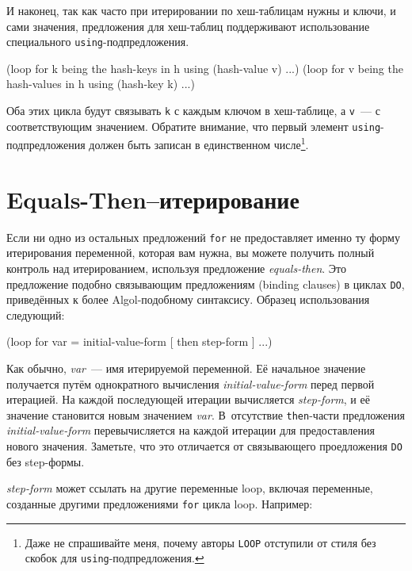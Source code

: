 И наконец, так как часто при итерировании по хеш-таблицам нужны и ключи, и сами значения,
предложения для хеш-таблиц поддерживают использование специального
\lstinline{using}-подпредложения.

\begin{myverb}
(loop for k being the hash-keys in h using (hash-value v) ...)
(loop for v being the hash-values in h using (hash-key k) ...)
\end{myverb}

Оба этих цикла будут связывать \lstinline{k} с каждым ключом в хеш-таблице, а \lstinline{v}~--- с
соответствующим значением. Обратите внимание, что первый элемент
\lstinline{using}-подпредложения должен быть записан в единственном числе\footnote{Даже не
    спрашивайте меня, почему авторы \lstinline{LOOP} отступили от стиля без скобок для
    \lstinline{using}-подпредложения.}\hspace{\footnotenegspace}.

\section{Equals-Then--итерирование}

Если ни одно из остальных предложений \lstinline{for} не предоставляет именно ту форму
итерирования переменной, которая вам нужна, вы можете получить полный контроль над
итерированием, используя предложение \textit{equals-then}. Это предложение подобно
связывающим предложениям (binding clauses) в циклах \lstinline{DO}, приведённых к более
Algol-подобному синтаксису. Образец использования следующий:

\begin{myverb}
(loop for var = initial-value-form [ then step-form ] ...)
\end{myverb}

Как обычно, \textit{var}~--- имя итерируемой переменной. Её начальное значение получается
путём однократного вычисления \textit{initial-value-form} перед первой итерацией. На
каждой последующей итерации вычисляется \textit{step-form}, и её значение становится новым
значением \textit{var}. В~отсутствие \lstinline{then}-части предложения
\textit{initial-value-form} перевычисляется на каждой итерации для предоставления нового
значения. Заметьте, что это отличается от связывающего проедложения \lstinline{DO} без
step-формы.

\textit{step-form} может ссылать на другие переменные loop, включая переменные, созданные
другими предложениями \lstinline{for} цикла loop. Например:

